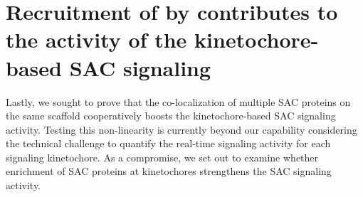 \section{Recruitment of  by   contributes to the activity of the kinetochore-based SAC signaling}
\label{per_se}


Lastly, we sought to prove that the co-localization of multiple SAC proteins on the same  scaffold cooperatively boosts the kinetochore-based SAC signaling activity. Testing this non-linearity  is currently beyond our capability considering the technical challenge to quantify the real-time signaling activity for each signaling kinetochore. As a compromise, we set out to examine whether enrichment of SAC proteins at kinetochores strengthens the SAC signaling activity.

